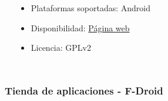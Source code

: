 \begin{frame}
\begin{columns}[c]
\begin{center}
            \end{center}
            \begin{itemize}
                \item Plataformas soportadas: Android
                \item Disponibilidad: \href{https://es.aptoide.com/}{Página web}
                \item Licencia: GPLv2
            \end{itemize}
    \end{columns}

\end{frame}

\begin{frame}

    \frametitle{Tienda de aplicaciones - F-Droid}


\end{frame}
